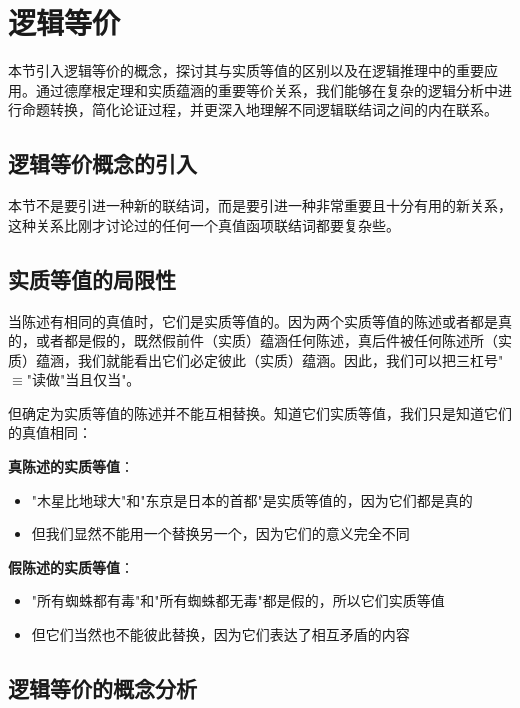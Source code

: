 \section{逻辑等价}

\begin{logicbox}[title=引言]
本节引入逻辑等价的概念，探讨其与实质等值的区别以及在逻辑推理中的重要应用。通过德摩根定理和实质蕴涵的重要等价关系，我们能够在复杂的逻辑分析中进行命题转换，简化论证过程，并更深入地理解不同逻辑联结词之间的内在联系。
\end{logicbox}

\subsection{逻辑等价概念的引入}

本节不是要引进一种新的联结词，而是要引进一种非常重要且十分有用的新关系，这种关系比刚才讨论过的任何一个真值函项联结词都要复杂些。

\subsection{实质等值的局限性}

当陈述有相同的真值时，它们是实质等值的。因为两个实质等值的陈述或者都是真的，或者都是假的，既然假前件（实质）蕴涵任何陈述，真后件被任何陈述所（实质）蕴涵，我们就能看出它们必定彼此（实质）蕴涵。因此，我们可以把三杠号"$\equiv$"读做"当且仅当"。

\begin{examplebox}[title=实质等值的局限性例证]
但确定为实质等值的陈述并不能互相替换。知道它们实质等值，我们只是知道它们的真值相同：

\textbf{真陈述的实质等值}：
\begin{itemize}
\item "木星比地球大"和"东京是日本的首都"是实质等值的，因为它们都是真的
\item 但我们显然不能用一个替换另一个，因为它们的意义完全不同
\end{itemize}

\textbf{假陈述的实质等值}：
\begin{itemize}
\item "所有蜘蛛都有毒"和"所有蜘蛛都无毒"都是假的，所以它们实质等值
\item 但它们当然也不能彼此替换，因为它们表达了相互矛盾的内容
\end{itemize}
\end{examplebox}

\subsection{逻辑等价的概念分析}

